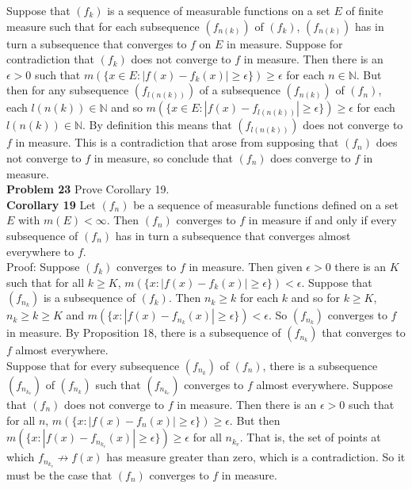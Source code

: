 \documentclass[a4paper]{article}
\begin{document}
Suppose that $(f_k)$ is a sequence of measurable functions on a set $E$ of finite measure such that for each subsequence $(f_{n(k)})$ of $(f_k)$, $(f_{n(k)})$ has in turn a subsequence that converges to $f$ on $E$ in measure. Suppose for contradiction that $(f_k)$ does not converge to $f$ in measure. Then there is an $\epsilon > 0$ such that $m(\{x \in E : |f(x) - f_k(x)| \geq \epsilon \}) \geq \epsilon$ for each $n \in \mathbb{N}$. But then for any subsequence $(f_{l(n(k))})$ of a subsequence $(f_{n(k)})$ of $(f_n)$, each $l(n(k)) \in \mathbb{N}$ and so $m(\{x \in E : |f(x) - f_{l(n(k))}| \geq \epsilon \}) \geq \epsilon$ for each $l(n(k)) \in \mathbb{N}$. By definition this means that $(f_{l(n(k))})$ does not converge to $f$ in measure. This is a contradiction that arose from supposing that $(f_n)$ does not converge to $f$ in measure, so conclude that $(f_n)$ does converge to $f$ in measure. \\

{\bf Problem 23} Prove Corollary 19.\\

{\bf Corollary 19} Let $(f_n)$ be a sequence of measurable functions defined on a set $E$ with $m(E) < \infty$. Then $(f_n)$ converges to $f$ in measure if and only if every subsequence of $(f_n)$ has in turn a subsequence that converges almost everywhere to $f$. \\

Proof: Suppose $(f_k)$ converges to $f$ in measure. Then given $\epsilon >0$ there is an $K$ such that for all $k\geq K$, $m(\{x : |f(x) - f_k(x)| \geq \epsilon \}) < \epsilon$. Suppose that $(f_{n_k})$ is a subsequence of $(f_k)$. Then $n_k \geq k$ for each $k$ and so for $k\geq K$, $n_k \geq k \geq K$ and $m(\{x : |f(x) - f_{n_k}(x)| \geq \epsilon \})<\epsilon$. So $(f_{n_k})$ converges to $f$ in measure. By Proposition 18, there is a subsequence of $(f_{n_k})$ that converges to $f$ almost everywhere.\\

Suppose that for every subsequence $(f_{n_k})$ of $(f_n)$, there is a subsequence $(f_{n_{k_v}})$ of $(f_{n_k})$ such that  $(f_{n_{k_v}})$ converges to $f$ almost everywhere. Suppose that $(f_n)$ does not converge to $f$ in measure. Then there is an $\epsilon > 0$ such that for all $n$, $m(\{x : |f(x) -f_n(x)| \geq \epsilon \}) \geq \epsilon$. But then $m(\{x : |f(x) -f_{n_{k_v}}(x)| \geq \epsilon \}) \geq \epsilon$ for all $n_{k_v}$. That is, the set of points at which $f_{n_{k_v}} \not\rightarrow f(x)$ has measure greater than zero, which is a contradiction. So it must be the case that $(f_n)$ converges to $f$ in measure. \\
\end{document}

